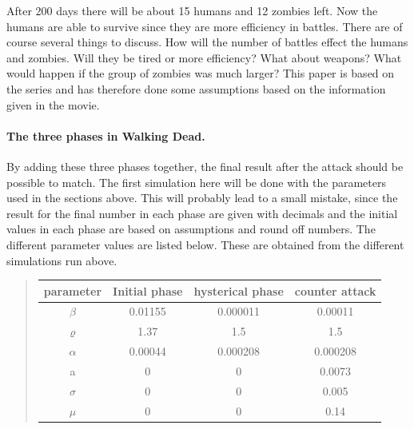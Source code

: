 \documentclass[%
twoside,                 %
final,                   %
10pt]{article}
\begin{document}
After 200 days there will be about 15 humans and 12 zombies left. Now the humans are able to survive since they are more efficiency in battles. There are of course several things to discuss. How will the number of battles effect the humans and zombies. Will they be tired or more efficiency? What about weapons? What would happen if the group of zombies was much larger? This paper is based on the series and has therefore done some assumptions based on the information given in the movie.

\paragraph{The three phases in Walking Dead.}
By adding these three phases together, the final result after the attack should be possible to match. The first simulation here will be done with the parameters used in the sections above. This will probably lead to a small mistake, since the result for the final number in each phase are given with decimals and the initial values in each phase are based on assumptions and round off numbers. The different parameter values are listed below. These are obtained from the different simulations run above.

\begin{quote}
\begin{tabular}{cccc}
\hline
\multicolumn{1}{c}{ parameter } & \multicolumn{1}{c}{ Initial phase } & \multicolumn{1}{c}{ hysterical phase } & \multicolumn{1}{c}{ counter attack } \\
\hline
$\beta$          & 0.01155          & 0.000011         & 0.00011          \\
$\varrho$        & 1.37             & 1.5              & 1.5              \\
$\alpha$         & 0.00044          & 0.000208         & 0.000208         \\
a                & 0                & 0                & 0.0073           \\
$\sigma$         & 0                & 0                & 0.005            \\
$\mu$            & 0                & 0                & 0.14             \\
\hline
\end{tabular}
\end{quote}

\noindent
\end{document}

